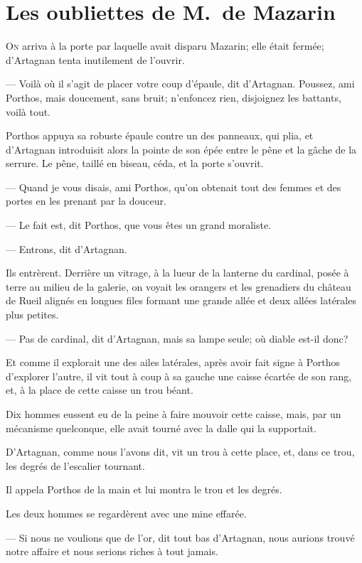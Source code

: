 \chapter{Les oubliettes de M.~de Mazarin}

\lettrine{O}{n} arriva à la porte par laquelle avait disparu Mazarin; elle était fermée; d'Artagnan tenta inutilement de l'ouvrir.

\zz
— Voilà où il s'agit de placer votre coup d'épaule, dit d'Artagnan. Poussez, ami Porthos, mais doucement, sans bruit; n'enfoncez rien, disjoignez les battants, voilà tout.

Porthos appuya sa robuste épaule contre un des panneaux, qui plia, et d'Artagnan introduisit alors la pointe de son épée entre le pêne et la gâche de la serrure. Le pêne, taillé en biseau, céda, et la porte s'ouvrit.

— Quand je vous disais, ami Porthos, qu'on obtenait tout des femmes et des portes en les prenant par la douceur.

— Le fait est, dit Porthos, que vous êtes un grand moraliste.

— Entrons, dit d'Artagnan.

Ils entrèrent. Derrière un vitrage, à la lueur de la lanterne du cardinal, posée à terre au milieu de la galerie, on voyait les orangers et les grenadiers du château de Rueil alignés en longues files formant une grande allée et deux allées latérales plus petites.

— Pas de cardinal, dit d'Artagnan, mais sa lampe seule; où diable est-il donc?

Et comme il explorait une des ailes latérales, après avoir fait signe à Porthos d'explorer l'autre, il vit tout à coup à sa gauche une caisse écartée de son rang, et, à la place de cette caisse un trou béant.

Dix hommes eussent eu de la peine à faire mouvoir cette caisse, mais, par un mécanisme quelconque, elle avait tourné avec la dalle qui la supportait.

D'Artagnan, comme nous l'avons dit, vit un trou à cette place, et, dans ce trou, les degrés de l'escalier tournant.

Il appela Porthos de la main et lui montra le trou et les degrés.

Les deux hommes se regardèrent avec une mine effarée.

— Si nous ne voulions que de l'or, dit tout bas d'Artagnan, nous aurions trouvé notre affaire et nous serions riches à tout jamais.

